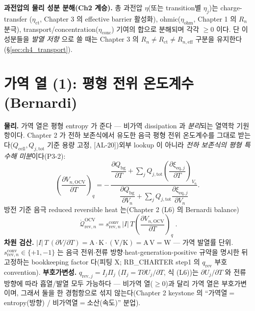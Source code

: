 \documentclass[11pt,a4paper]{article}
\newcommand{\eff}{\mathrm{eff}}
\newcommand{\eq}{\mathrm{eq}}
\newcommand{\bg}{\mathrm{bg}}
\newcommand{\cell}{\mathrm{cell}}
\newcommand{\OCV}{\mathrm{OCV}}
\newcommand{\tot}{\mathrm{tot}}
\newcommand{\rev}{\mathrm{rev}}
\newcommand{\ct}{\mathrm{ct}}
\newcommand{\ohm}{\mathrm{ohm}}
\newcommand{\conc}{\mathrm{conc}}
\newcommand{\conv}{\mathrm{conv}}
\newcommand{\AL}[1]{\textsf{[AL-#1]}}
\begin{document}
\textbf{과전압의 물리 성분 분해(Ch2 계승).} 총 과전압 $\eta$(또는 transition별 $\eta_j$)는 charge-transfer
($\eta_\ct$, Chapter 3 의 effective barrier 활성화), ohmic($\eta_\ohm$, Chapter 1 의 $R_n$ 분극),
transport/concentration($\eta_\conc$) 기여의 합으로 분해되며 각각 $\ge0$ 이다. 단 이 성분들을 \emph{발열 저항}
으로 쓸 때는 Chapter 3 의 $R_n\ne R_\ct\ne R_{n,\eff}$ 구분을 유지한다(\S\ref{sec:ch4_transport}).

\section{가역 열 (1): 평형 전위 온도계수 (Bernardi)}\label{sec:ch4_revOCV}
\textbf{물리.} 가역 열은 평형 entropy 가 준다 — 비가역 dissipation 과 \emph{분리}되는 열역학 기원 항이다.
Chapter 2 가 전하 보존식에서 유도한 음극 평형 전위 온도계수를 그대로 받는다($Q_\cell,Q_{j,\tot}$ 기준 용량
고정, \AL{20})\textemdash 외부 lookup 이 아니라 \emph{전하 보존식의 평형 특수해 미분}이다(P3-2):
\begin{equation}
\left(\frac{\partial V_{n,\OCV}}{\partial T}\right)_q
=-\,\frac{\dfrac{\partial Q_\bg}{\partial T}+\displaystyle\sum_j Q_{j,\tot}\left(\dfrac{\partial\xi_{\eq,j}}{\partial T}\right)_{V_n}}
{\dfrac{\partial Q_\bg}{\partial V_n}+\displaystyle\sum_j Q_{j,\tot}\dfrac{\partial\xi_{\eq,j}}{\partial V_n}}.
\label{eq:ch4_ocv_dvdt}
\end{equation}
방전 기준 음극 reduced reversible heat 는(Chapter 2 (L6) 의 Bernardi balance)
\begin{equation}
\boxed{\;\dot{\mathcal Q}_{\rev,n}^{\OCV}=s_{\rev,n}^{\conv}\,|I|\,T\left(\frac{\partial V_{n,\OCV}}{\partial T}\right)_q\;.}
\label{eq:ch4_rev_ocv}
\end{equation}
\textbf{차원 검산.} $|I|\,T\,(\partial V/\partial T)=\mathrm A\cdot\mathrm K\cdot(\mathrm{V/K})=\mathrm{A\,V}=\mathrm W$
— 가역 발열률 단위. $s_{\rev,n}^{\conv}\in\{+1,-1\}$ 는 음극 전위$\cdot$전류 방향$\cdot$heat-generation-positive
규약을 명시한 뒤 고정하는 bookkeeping factor 다(피팅 X; RB\_CHARTER step1 의 $q_\rev$ 부호 convention).
\textbf{부호가변성.} $q_{\rev,j}=I_j\Pi_j$ ($\Pi_j=T\partial U_j/\partial T$, 식 (L6))는 $\partial U_j/\partial T$
와 전류 방향에 따라 흡열/발열 모두 가능하다 — 비가역 열($\ge0$)과 달리 가역 열은 부호가변이며, 그래서 둘을 한
경험항으로 섞지 않는다(Chapter 2 keystone 의 ``가역열$=$entropy(방향) / 비가역열$=$소산(속도)'' 분업).
\end{document}
